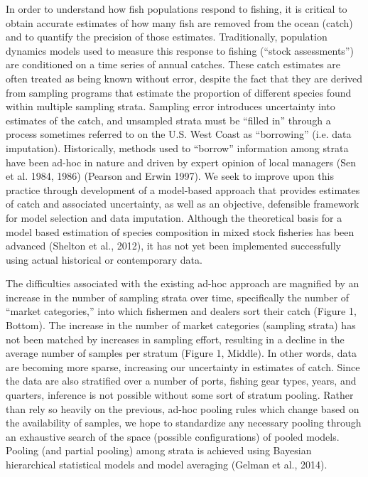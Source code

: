 \documentclass[12pt]{article}
\begin{document}
%
In order to understand how fish populations respond to fishing, it is critical to obtain accurate estimates of how many fish are removed from the ocean (catch) and to quantify the precision of those estimates. 
Traditionally, population dynamics models used to measure this response to fishing (“stock assessments”) are conditioned on a time series of annual catches. 
These catch estimates are often treated as being known without error, despite the fact that they are derived from sampling programs that estimate the proportion of different species found within multiple sampling strata. 
Sampling error introduces uncertainty into estimates of the catch, and unsampled strata must be “filled in” through a process sometimes referred to on the U.S. West Coast as “borrowing” (i.e. data imputation). 
Historically, methods used to “borrow” information among strata have been ad-hoc in nature and driven by expert opinion of local managers (Sen et al. 1984, 1986) (Pearson and Erwin 1997). 
We seek to improve upon this practice through development of a model-based approach that provides estimates of catch and associated uncertainty, as well as an objective, defensible framework for model selection and data imputation.
Although the theoretical basis for a model based estimation of species composition in mixed stock fisheries has been advanced (Shelton et al., 2012), it has not yet been implemented successfully using actual historical or contemporary data.

%
The difficulties associated with the existing ad-hoc approach are magnified by an increase in the number of sampling strata over time, specifically the number of “market categories,” into which fishermen and dealers sort their catch (Figure 1, Bottom). 
The increase in the number of market categories (sampling strata) has not been matched by increases in sampling effort, resulting in a decline in the average number of samples per stratum (Figure 1, Middle). 
In other words, data are becoming more sparse, increasing our uncertainty in estimates of catch. 
Since the data are also stratified over a number of ports, fishing gear types, years, and quarters, inference is not possible without some sort of stratum pooling. 
Rather than rely so heavily on the previous, ad-hoc pooling rules which change based on the availability of samples, we hope to standardize any necessary pooling through an exhaustive search of the space (possible configurations) of pooled models. 
Pooling (and partial pooling) among strata is achieved using Bayesian hierarchical statistical models and model averaging (Gelman et al., 2014).
\end{document}
